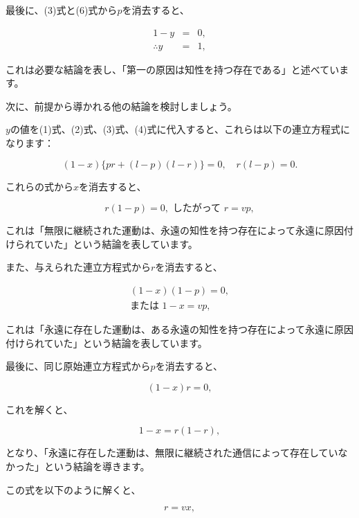 \documentclass[a4paper,11pt,openany]{ltjsbook}
\begin{document}
最後に、(3)式と(6)式から$p$を消去すると、

\begin{eqnarray*}
1 - y &=& 0, \\
\therefore y &=& 1,
\end{eqnarray*}

これは必要な結論を表し、「第一の原因は知性を持つ存在である」と述べています。

次に、前提から導かれる他の結論を検討しましょう。

$y$の値を(1)式、(2)式、(3)式、(4)式に代入すると、これらは以下の連立方程式になります：

\begin{equation*}
(1-x) \lbrace pr + (l-p)(l-r) \rbrace = 0, \quad r(l-p) = 0.   \tag{7}
\end{equation*}

これらの式から$x$を消去すると、

\begin{equation*}
r(1-p) = 0, \text{ したがって } r = vp,
\end{equation*}

これは「無限に継続された運動は、永遠の知性を持つ存在によって永遠に原因付けられていた」という結論を表しています。

また、与えられた連立方程式から$r$を消去すると、

\begin{gather*}
(1-x)(1-p) = 0, \\
\text{または } 1 - x = vp,
\end{gather*}

これは「永遠に存在した運動は、ある永遠の知性を持つ存在によって永遠に原因付けられていた」という結論を表しています。

最後に、同じ原始連立方程式から$p$を消去すると、

\begin{equation*}
(1-x)r = 0,
\end{equation*}

これを解くと、

\begin{equation*}
1 - x = r(1 - r),
\end{equation*}

となり、「永遠に存在した運動は、無限に継続された通信によって存在していなかった」という結論を導きます。

この式を以下のように解くと、

\begin{equation*}
r = vx,
\end{equation*}
\end{document}
